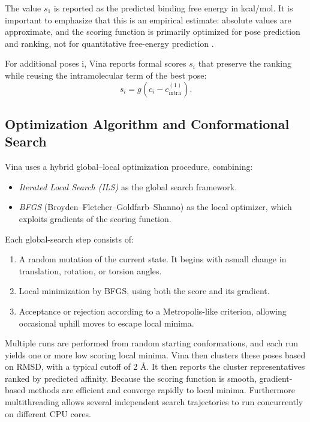 \documentclass[12pt, a4paper]{article}
\begin{document}
The value $s_1$ is reported as the predicted binding free energy in kcal/mol.  It is important to emphasize that this is an empirical estimate: absolute values are approximate, and the scoring function is primarily optimized for pose prediction and ranking, not for quantitative free-energy prediction \cite{CH7_trott2010vina,CH7_forli2016autodock}.

For additional poses i, Vina reports formal scores $s_i$ that preserve the ranking while reusing the intramolecular term of the best pose:
\[
  s_i = g\!\left(c_i - c_{\text{intra}}^{(1)}\right).
\]

\subsection{Optimization Algorithm and Conformational Search}

Vina uses a hybrid global–local optimization procedure, combining:
\begin{itemize}
  \item \textit{Iterated Local Search (ILS)} as the global search framework.
  \item \textit{BFGS} (Broyden–Fletcher–Goldfarb–Shanno) as the local optimizer, which exploits gradients of the scoring function.
\end{itemize}

Each global-search step consists of:
\begin{enumerate}
  \item A random mutation of the current state. It begins with asmall change in translation, rotation, or torsion angles.
  \item Local minimization by BFGS, using both the score and its gradient.
  \item Acceptance or rejection according to a Metropolis-like criterion, allowing occasional uphill moves to escape local minima.
\end{enumerate}

Multiple runs are performed from random starting conformations, and each run yields one or more low scoring local minima. 
Vina then clusters these poses based on RMSD, with a typical cutoff of 2 \r{A}.  It then reports the cluster representatives ranked by predicted affinity. Because the scoring function is smooth, gradient-based methods are efficient and converge rapidly to local minima.  Furthermore multithreading allows several independent search trajectories to run concurrently on different CPU cores. \cite{CH7_trott2010vina}
\end{document}
